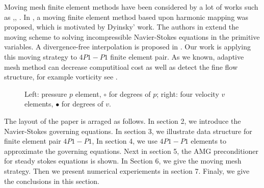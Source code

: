 \documentclass[a4paper, 11pt]{article}
\begin{document}
    Moving mesh finite element methods have been considered by a lot
    of works such as
    \cite{Winslow1966NUMERICAL},\cite{dvinsky1991adaptive},
    \cite{li2001mesh}. In \cite{li2001mesh}, a moving finite element
    method based upon harmonic mapping was proposed, which is
    motivated by Dyinsky' work. The authors in\cite{di2005moving}
    extend the moving scheme to solving incompressible Navier-Stokes
    equations in the primitive variables. A divergence-free
    interpolation is proposed in \cite{di2005moving}. Our work is
    applying this moving strategy to $4P1-P1$ finite element pair. As
    we known, adaptive mesh method can decrease computitioal cost as
    well as detect the fine flow structure, for example vorticity see
    \cite{popiolek2006numerical}.

    \begin{figure}
      \centering    
      \caption{Left: pressure $p$ element, $\circ$ for degrees of $p$; 
               right: four velocity $v$ elements, $\bullet$ for degrees
               of $v$.}
      \label{fig::p-v}       
    \end{figure}
      
       The layout of the paper is arraged as follows. In section 2, we
    introduce the Navier-Stokes governing equations. In section 3, we
    illustrate data structure for finite element pair $4P1-P1$, In
    section 4, we use $4P1-P1$ elements to approximate the governing
    equations. Next in section 5, the AMG preconditioner for steady
    stokes equations is shown. In Section 6, we give the moving mesh
    strategy. Then we present numerical experiements in section 7. 
    Finaly, we give the conclusions in this section.

    
\end{document}
